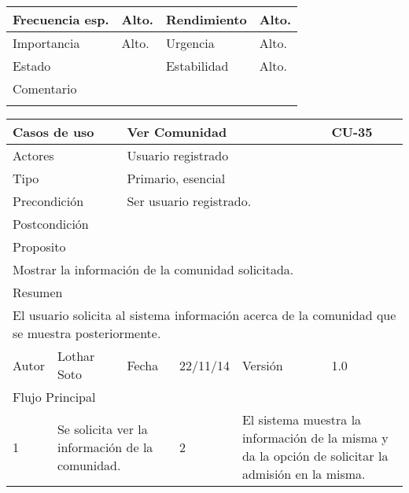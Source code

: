 \documentclass{article}
\begin{document}
\begin{table}[h]
\begin{tabular}{|l|l|l|l|l|l|}
\hline
\multicolumn{1}{|p{2cm}|}{Frecuencia esp.} & \multicolumn{2}{p{3cm}}{Alto.} & \multicolumn{1}{|p{2cm}|}{Rendimiento} & \multicolumn{2}{p{3cm}|}{Alto.}\\
\hline
\multicolumn{1}{|p{2cm}|}{Importancia} & \multicolumn{2}{p{3cm}}{Alto.} & \multicolumn{1}{|p{2cm}|}{Urgencia} & \multicolumn{2}{p{3cm}|}{Alto.}\\
\hline
\multicolumn{1}{|p{2cm}|}{Estado} & \multicolumn{2}{p{3cm}}{} & \multicolumn{1}{|p{2cm}|}{Estabilidad} & \multicolumn{2}{p{3cm}|}{Alto.}\\
\hline
\multicolumn{6}{|p{10cm}|}{Comentario}\\
\hline
\multicolumn{6}{|p{10cm}|}{}\\
\hline
\end{tabular}
\end{table}
\begin{table}[h]
\begin{tabular}{|l|l|l|l|l|l|}
\hline
\multicolumn{2}{|p{2cm}|}{Casos de uso}  & \multicolumn{3}{p{7cm}|}{Ver Comunidad} & CU-35 \\
\hline
\multicolumn{2}{|p{2cm}|}{Actores}       & \multicolumn{4}{p{8cm}|}{Usuario registrado}        \\
\hline
\multicolumn{2}{|p{2cm}|}{Tipo}          & \multicolumn{4}{p{8cm}|}{Primario, esencial}        \\
\hline
\multicolumn{2}{|p{2cm}|}{Precondición}  & \multicolumn{4}{p{8cm}|}{Ser usuario registrado.}        \\
\hline
\multicolumn{2}{|p{2cm}|}{Postcondición} & \multicolumn{4}{p{8cm}|}{}        \\
\hline
\multicolumn{6}{|p{10cm}|}{Proposito}                                   \\
\hline
\multicolumn{6}{|p{10cm}|}{Mostrar la información de la comunidad solicitada.}                                            \\
\hline
\multicolumn{6}{|p{10cm}|}{Resumen}                                 \\
\hline
\multicolumn{6}{|p{10cm}|}{El usuario solicita al sistema información acerca de la comunidad que se muestra posteriormente.}                                            \\
\hline
Autor         &       Lothar Soto        &  Fecha   &  22/11/14   &   Versión  & 1.0\\
\hline
\multicolumn{6}{|p{10cm}|}{Flujo Principal}\\
\hline
\multicolumn{1}{|p{1cm}|}{1} & \multicolumn{2}{p{3cm}}{Se solicita ver la información de la comunidad.} & \multicolumn{1}{|p{1cm}|}{2} & \multicolumn{2}{p{3cm}|}{El sistema muestra la información de la misma y da la opción de solicitar la admisión en la misma.}\\

\end{tabular}
\end{table}
\end{document}
